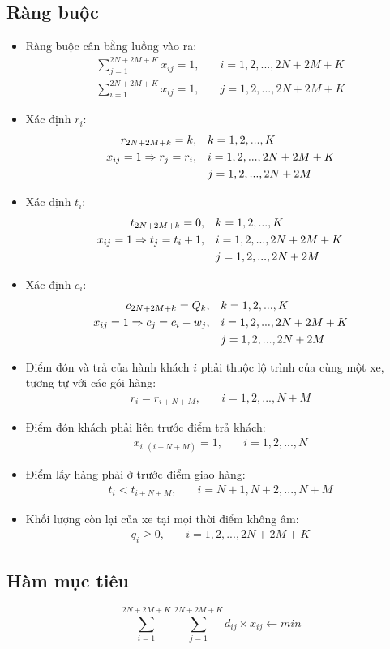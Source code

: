 \documentclass[3p,12pt]{article}
\begin{document}
	\subsection{Ràng buộc}
	\begin{itemize}
		\item Ràng buộc cân bằng luồng vào ra:
		\begin{align}
			\sum_{j=1}^{2N+2M+K} x_{ij} = 1,\quad & i=1,2,...,2N+2M+K \\
			\sum_{i=1}^{2N+2M+K} x_{ij} = 1,\quad & j=1,2,...,2N+2M+K
		\end{align}
		\item Xác định $r_i$:
		\begin{align}
			r_{2N+2M+k} = k,\quad & k=1,2,...,K \\
			x_{ij}=1\Rightarrow r_j=r_i,\quad & i=1,2,...,2N+2M+K \\
			& j=1,2,...,2N+2M \notag
		\end{align}
		\item Xác định $t_i$:
		\begin{align}
			t_{2N+2M+k} = 0,\quad & k=1,2,...,K \\
			x_{ij}=1\Rightarrow t_j=t_i + 1,\quad & i=1,2,...,2N+2M+K \\
											& j=1,2,...,2N+2M \notag
		\end{align}
		\item Xác định $c_i$:
		\begin{align}
			c_{2N+2M+k} = Q_k,\quad & k=1,2,...,K \\
			x_{ij}=1\Rightarrow c_j=c_i - w_j,\quad & i=1,2,...,2N+2M+K \\
											& j=1,2,...,2N+2M \notag
		\end{align}
		\item Điểm đón và trả của hành khách $i$ phải thuộc lộ trình của cùng một xe, tương tự với các gói hàng:
		\begin{align}
			r_i = r_{i+N+M},\quad & i=1,2,...,N+M
		\end{align}
		\item Điểm đón khách phải liền trước điểm trả khách:
		\begin{align}
			x_{i,(i+N+M)} = 1,\quad & i=1,2,...,N
		\end{align}
		\item Điểm lấy hàng phải ở trước điểm giao hàng:
		\begin{align}
			t_i < t_{i+N+M},\quad & i=N+1,N+2,...,N+M
		\end{align}
		\item Khối lượng còn lại của xe tại mọi thời điểm không âm:
		\begin{align}
			q_i \geq 0,\quad & i=1,2,...,2N+2M+K
		\end{align}
	\end{itemize}

	\subsection{Hàm mục tiêu}
	\begin{equation}
		\sum_{i=1}^{2N+2M+K} \sum_{j=1}^{2N+2M+K} d_{ij}\times x_{ij} \leftarrow min
	\end{equation}
\end{document}
